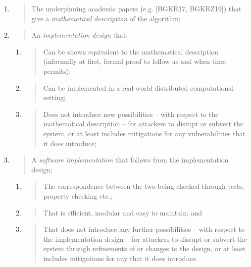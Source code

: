 \documentclass[]{article}
\begin{document}
\begin{enumerate}
\def\labelenumi{\arabic{enumi}.}
\item
  \begin{quote}
  The underpinning academic papers (e.g. {[}BGKR17, BGKRZ19{]}) that
  give a \emph{mathematical description} of the algorithm;
  \end{quote}
\item
  \begin{quote}
  An \emph{implementation design} that:
  \end{quote}

  \begin{enumerate}
  \def\labelenumii{\alph{enumii}.}
  \item
    \begin{quote}
    Can be shown equivalent to the mathematical description (informally
    at first, formal proof to follow as and when time permits);
    \end{quote}
  \item
    \begin{quote}
    Can be implemented in a real-world distributed computational
    setting;
    \end{quote}
  \item
    \begin{quote}
    Does not introduce new possibilities -- with respect to the
    mathematical description -- for attackers to disrupt or subvert the
    system, or at least includes mitigations for any vulnerabilities
    that it does introduce;
    \end{quote}
  \end{enumerate}
\item
  \begin{quote}
  A \emph{software implementation} that follows from the implementation
  design;
  \end{quote}

  \begin{enumerate}
  \def\labelenumii{\alph{enumii}.}
  \setcounter{enumii}{3}
  \item
    \begin{quote}
    The correspondence between the two being checked through tests,
    property checking etc.;
    \end{quote}
  \item
    \begin{quote}
    That is efficient, modular and easy to maintain; and
    \end{quote}
  \item
    \begin{quote}
    That does not introduce any further possibilities -- with respect to
    the implementation design -- for attackers to disrupt or subvert the
    system through refinements of or changes to the design, or at least
    includes mitigations for any that it does introduce.
    \end{quote}
  \end{enumerate}
\end{enumerate}
\end{document}
